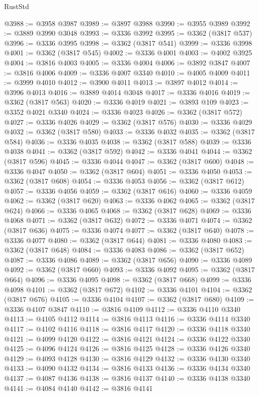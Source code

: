 \begin{lexlean}{RustStd}
\begin{coremodule}
@3988 := @3958 @3987
@3989 := @3897 @3988
@3990 := @3955 @3989
@3992 := @3889 @3990 @3048
@3993 := @3336 @3992
@3995 := @3362 (@3817 @537)
@3996 := @3336 @3995
@3998 := @3362 (@3817 @541)
@3999 := @3336 @3998
@4001 := @3362 (@3817 @545)
@4002 := @3336 @4001
@4003 := @4002 @3925
@4004 := @3816 @4003
@4005 := @3336 @4004
@4006 := @3892 @3847
@4007 := @3816 @4006
@4009 := @3336 @4007 @3340
@4010 := @4005 @4009
@4011 := @3999 @4010
@4012 := @3900 @4011
@4013 := @3897 @4012
@4014 := @3996 @4013
@4016 := @3889 @4014 @3048
@4017 := @3336 @4016
@4019 := @3362 (@3817 @563)
@4020 := @3336 @4019
@4021 := @3893 @109
@4023 := @3352 @4021 @3340
@4024 := @3336 @4023
@4026 := @3362 (@3817 @572)
@4027 := @3336 @4026
@4029 := @3362 (@3817 @576)
@4030 := @3336 @4029
@4032 := @3362 (@3817 @580)
@4033 := @3336 @4032
@4035 := @3362 (@3817 @584)
@4036 := @3336 @4035
@4038 := @3362 (@3817 @588)
@4039 := @3336 @4038
@4041 := @3362 (@3817 @592)
@4042 := @3336 @4041
@4044 := @3362 (@3817 @596)
@4045 := @3336 @4044
@4047 := @3362 (@3817 @600)
@4048 := @3336 @4047
@4050 := @3362 (@3817 @604)
@4051 := @3336 @4050
@4053 := @3362 (@3817 @608)
@4054 := @3336 @4053
@4056 := @3362 (@3817 @612)
@4057 := @3336 @4056
@4059 := @3362 (@3817 @616)
@4060 := @3336 @4059
@4062 := @3362 (@3817 @620)
@4063 := @3336 @4062
@4065 := @3362 (@3817 @624)
@4066 := @3336 @4065
@4068 := @3362 (@3817 @628)
@4069 := @3336 @4068
@4071 := @3362 (@3817 @632)
@4072 := @3336 @4071
@4074 := @3362 (@3817 @636)
@4075 := @3336 @4074
@4077 := @3362 (@3817 @640)
@4078 := @3336 @4077
@4080 := @3362 (@3817 @644)
@4081 := @3336 @4080
@4083 := @3362 (@3817 @648)
@4084 := @3336 @4083
@4086 := @3362 (@3817 @652)
@4087 := @3336 @4086
@4089 := @3362 (@3817 @656)
@4090 := @3336 @4089
@4092 := @3362 (@3817 @660)
@4093 := @3336 @4092
@4095 := @3362 (@3817 @664)
@4096 := @3336 @4095
@4098 := @3362 (@3817 @668)
@4099 := @3336 @4098
@4101 := @3362 (@3817 @672)
@4102 := @3336 @4101
@4104 := @3362 (@3817 @676)
@4105 := @3336 @4104
@4107 := @3362 (@3817 @680)
@4109 := @3336 @4107 @3847
@4110 := @3816 @4109
@4112 := @3336 @4110 @3340
@4113 := @4105 @4112
@4114 := @3816 @4113
@4116 := @3336 @4114 @3340
@4117 := @4102 @4116
@4118 := @3816 @4117
@4120 := @3336 @4118 @3340
@4121 := @4099 @4120
@4122 := @3816 @4121
@4124 := @3336 @4122 @3340
@4125 := @4096 @4124
@4126 := @3816 @4125
@4128 := @3336 @4126 @3340
@4129 := @4093 @4128
@4130 := @3816 @4129
@4132 := @3336 @4130 @3340
@4133 := @4090 @4132
@4134 := @3816 @4133
@4136 := @3336 @4134 @3340
@4137 := @4087 @4136
@4138 := @3816 @4137
@4140 := @3336 @4138 @3340
@4141 := @4084 @4140
@4142 := @3816 @4141

\end{coremodule}
\end{lexlean}
